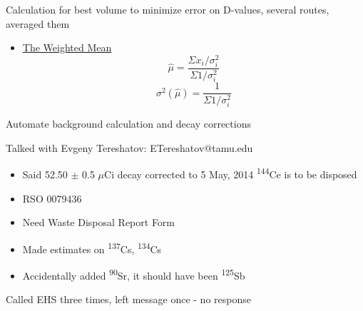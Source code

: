 \documentclass[idxtotoc,hyperref,openany,oneside]{labbook} %
\newcommand{\cmark}{\ding{51}}%
\newcommand{\done}{\rlap{$\square$}{\raisebox{2pt}{\large\hspace{1pt}\cmark}}%
  \hspace{-2.5pt}}
\newcommand{\tss}{\textsuperscript}
\begin{document}
\begin{todolist}
\item[\done]{Calculation for best volume to minimize error on
  D-values, several routes, averaged them}
  \begin{itemize}
  \item{\href{https://ned.ipac.caltech.edu/level5/Leo/Stats4_5.html}{
      The Weighted Mean}}
    \begin{equation*}
      \hat{\mu}=\frac{\Sigma x_i/\sigma_i^2}{\Sigma 1/\sigma_i^2}
    \end{equation*}
    \begin{equation*}
      \sigma^2(\hat{\mu})=\frac{1}{\Sigma1/\sigma_i^2}
    \end{equation*}
  \end{itemize}
\item{Automate background calculation and decay corrections}
\end{todolist}


\begin{todolist}
\item[\done]{Talked with Evgeny Tereshatov: ETereshatov@tamu.edu}
  \begin{itemize}
  \item{Said 52.50 $\pm$ 0.5 $\mu$Ci decay corrected to 5 May, 2014
    \tss{144}Ce is to be disposed}
  \item{RSO 0079436}
  \item{Need Waste Disposal Report Form}
  \item{Made estimates on \tss{137}Cs, \tss{134}Cs}
  \item{Accidentally added \tss{90}Sr, it should have been
    \tss{125}Sb}
  \end{itemize}
\item[\done]{Called EHS three times, left message once - no response}
\end{todolist}



\end{document}
